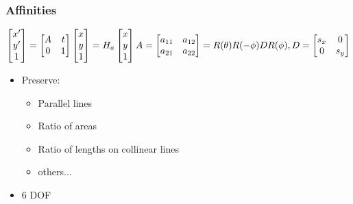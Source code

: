 \subsubsection{Affinities}
$$\begin{bmatrix}
	x' \\ y' \\ 1
\end{bmatrix}=\begin{bmatrix}
	A & t\\ 0 & 1
\end{bmatrix}\begin{bmatrix}
	x \\ y \\  1
\end{bmatrix}=H_a \begin{bmatrix}
	x\\y\\1
\end{bmatrix}\\
A=\begin{bmatrix}
	a_{11} & a_{12} \\ 
	a_{21} & a_{22}
\end{bmatrix}=R(\theta)R(-\phi)DR(\phi), D=\begin{bmatrix}
	s_x & 0 \\ 0 & s_y
\end{bmatrix}$$
\begin{itemize}
	\item Preserve:
	\begin{itemize}
		\item Parallel lines
		\item Ratio of areas
		\item Ratio of lengths on collinear lines
		\item others...
	\end{itemize}
	\item 6 DOF
\end{itemize}
	
